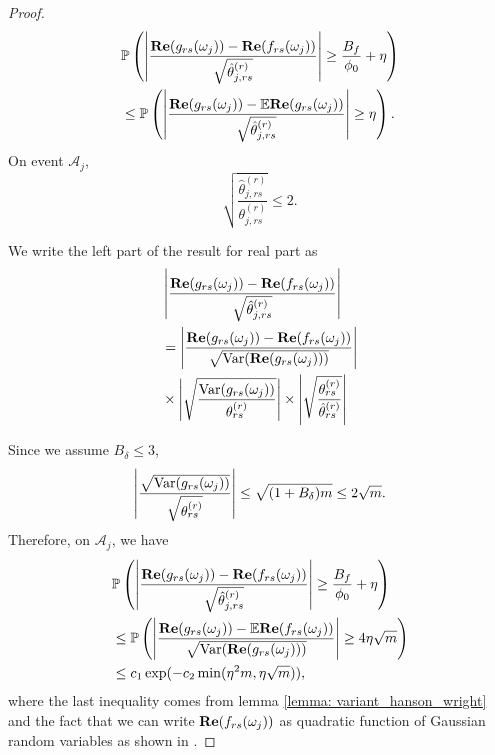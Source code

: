 \begin{proof}
\begin{equation}
\begin{aligned}
& \mathbb{P}\left(\left|\frac{{\bf Re}(g_{rs}(\omega_j)) - {\bf Re}(f_{rs}(\omega_j))}{\sqrt{\hat{\theta}^{(r)}_{j,rs}}}\right| \ge \frac{B_f}{\phi_0}+\eta\right) \\
& \le \mathbb{P}\left(\left|\frac{{\bf Re}(g_{rs}(\omega_j)) - \mathbb{E} {\bf Re}(g_{rs}(\omega_j))}{\sqrt{\hat{\theta}^{(r)}_{j,rs}}}\right| \ge \eta\right) .
\end{aligned}
\end{equation}
On event  $\mathcal{A}_j$, 
\[
\sqrt{\frac{\hat{\theta}^{(r)}_{j, rs}}{\theta^{(r)}_{j, rs}}} \le 2. 
\]

We write the left part of the result for real part as  
\begin{equation}
\begin{aligned}
& \left|\frac{{\bf Re}(g_{rs}(\omega_j)) - {\bf Re}(f_{rs}(\omega_j))}{\sqrt{\hat{\theta}^{(r)}_{j,rs}}}\right|  \\
& = \left|\frac{{\bf Re}(g_{rs}(\omega_j)) - {\bf Re}(f_{rs}(\omega_j))}{\sqrt{\mathrm{Var}({\bf Re}(g_{rs}(\omega_j)))}}\right|\\
& \times \left|\sqrt{\frac{\mathrm{Var}(g_{rs}(\omega_j))}{\theta^{(r)}_{rs}}}\right| \times \left|\sqrt{\frac{\theta^{(r)}_{rs}}{\hat{\theta}^{(r)}_{rs}}}\right|
\end{aligned}
\end{equation}


Since we assume $B_\delta\le 3$, 
\[
\left|\frac{\sqrt{\mathrm{Var}(g_{rs}(\omega_j))}}{\sqrt{\theta^{(r)}_{rs}}}\right| \le \sqrt{(1+B_\delta)m}\le 2\sqrt{m}. 
\]
Therefore, on $\mathcal{A}_j$, we have 
\begin{equation}
\begin{aligned}
& \mathbb{P}\left(\left|\frac{{\bf Re}(g_{rs}(\omega_j)) - {\bf Re}(f_{rs}(\omega_j))}{\sqrt{\hat{\theta}^{(r)}_{j,rs}}}\right| \ge \frac{B_f}{\phi_0}+\eta\right) \\
& \le \mathbb{P}\left(\left|\frac{{\bf Re}(g_{rs}(\omega_j)) - \mathbb{E} {\bf Re}(f_{rs}(\omega_j))}{\sqrt{\mathrm{Var}({\bf Re}(g_{rs}(\omega_j)))}}\right| \ge 4\eta\sqrt{m} \right)\\
& \le c_1\exp(-c_2\min(\eta^2 m, \eta \sqrt{m})), 
\end{aligned}
\end{equation}
where the last inequality comes from lemma \ref{lemma: variant_hanson_wright} and the fact that we can write 
${\bf Re}(f_{rs}(\omega_j))$ as quadratic function of Gaussian random variables as shown in \cite{sun2018large}. 
\end{proof}



